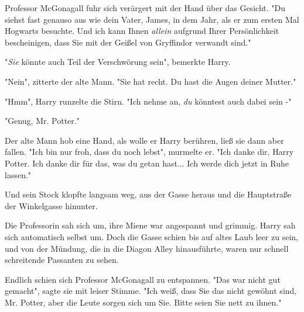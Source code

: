 Professor McGonagall fuhr sich verärgert mit der Hand über das Gesicht. "Du siehst fast genauso aus wie dein Vater, James, in dem Jahr, als er zum ersten Mal Hogwarts besuchte. Und ich kann Ihnen \emph{allein} aufgrund Ihrer Persönlichkeit bescheinigen, dass Sie mit der Geißel von Gryffindor verwandt sind." 

"\emph{Sie} könnte auch Teil der Verschwörung sein", bemerkte Harry.

"Nein", zitterte der alte Mann. "Sie hat recht. Du hast die Augen deiner Mutter."

"Hmm", Harry runzelte die Stirn. "Ich nehme an, \emph{du} könntest auch dabei sein -"

"Genug, Mr. Potter." 

Der alte Mann hob eine Hand, als wolle er Harry berühren, ließ sie dann aber fallen. "Ich bin nur froh, dass du noch lebst", murmelte er. "Ich danke dir, Harry Potter. Ich danke dir für das, was du getan hast... Ich werde dich jetzt in Ruhe lassen."

Und sein Stock klopfte langsam weg, aus der Gasse heraus und die Hauptstraße der Winkelgasse hinunter.


Die Professorin sah sich um, ihre Miene war angespannt und grimmig. Harry sah sich automatisch selbst um. Doch die Gasse schien bis auf altes Laub leer zu sein, und von der Mündung, die in die Diagon Alley hinausführte, waren nur schnell schreitende Passanten zu sehen.

Endlich schien sich Professor McGonagall zu entspannen. "Das war nicht gut gemacht", sagte sie mit leiser Stimme. "Ich weiß, dass Sie das nicht gewöhnt sind, Mr. Potter, aber die Leute sorgen sich um Sie. Bitte seien Sie nett zu ihnen."

